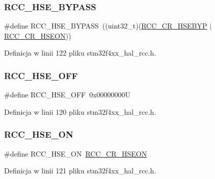 \subsubsection{\texorpdfstring{R\+C\+C\+\_\+\+H\+S\+E\+\_\+\+B\+Y\+P\+A\+SS}{RCC\_HSE\_BYPASS}}
{\footnotesize\ttfamily \#define R\+C\+C\+\_\+\+H\+S\+E\+\_\+\+B\+Y\+P\+A\+SS~((uint32\+\_\+t)(\hyperlink{group___peripheral___registers___bits___definition_gaa3288090671af5a959aae4d7f7696d55}{R\+C\+C\+\_\+\+C\+R\+\_\+\+H\+S\+E\+B\+YP} $\vert$ \hyperlink{group___peripheral___registers___bits___definition_gadb8228c9020595b4cf9995137b8c9a7d}{R\+C\+C\+\_\+\+C\+R\+\_\+\+H\+S\+E\+ON}))}



Definicja w linii 122 pliku stm32f4xx\+\_\+hal\+\_\+rcc.\+h.

\mbox{\label{group___r_c_c___h_s_e___config_ga1616626d23fbce440398578855df6f97}} 
\subsubsection{\texorpdfstring{R\+C\+C\+\_\+\+H\+S\+E\+\_\+\+O\+FF}{RCC\_HSE\_OFF}}
{\footnotesize\ttfamily \#define R\+C\+C\+\_\+\+H\+S\+E\+\_\+\+O\+FF~0x00000000U}



Definicja w linii 120 pliku stm32f4xx\+\_\+hal\+\_\+rcc.\+h.

\mbox{\label{group___r_c_c___h_s_e___config_gabc4f70a44776c557af20496b04d9a9db}} 
\subsubsection{\texorpdfstring{R\+C\+C\+\_\+\+H\+S\+E\+\_\+\+ON}{RCC\_HSE\_ON}}
{\footnotesize\ttfamily \#define R\+C\+C\+\_\+\+H\+S\+E\+\_\+\+ON~\hyperlink{group___peripheral___registers___bits___definition_gadb8228c9020595b4cf9995137b8c9a7d}{R\+C\+C\+\_\+\+C\+R\+\_\+\+H\+S\+E\+ON}}



Definicja w linii 121 pliku stm32f4xx\+\_\+hal\+\_\+rcc.\+h.

